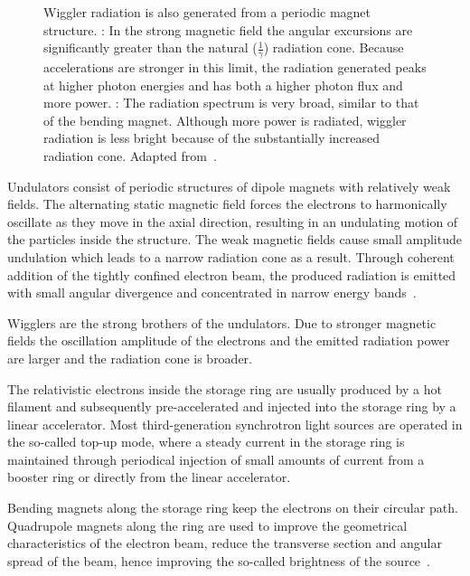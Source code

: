 \begin{figure}%
	\noindent{}
	\caption[Wiggler radiation]{Wiggler radiation is also generated from a periodic magnet structure. %
		: In the strong magnetic field the angular excursions are significantly greater than the natural ($\frac{1}{\gamma}$) radiation cone. Because accelerations are stronger in this limit, the radiation generated peaks at higher photon energies and has both a higher photon flux and more power. %
		: The radiation spectrum is very broad, similar to that of the bending magnet. Although more power is radiated, wiggler radiation is less bright because of the substantially increased radiation cone. Adapted from~\cite{Attwood2007}.}%
	\label{fig:wiggler}
\end{figure}%

Undulators consist of periodic structures of dipole magnets with relatively weak fields. The alternating static magnetic field forces the electrons to harmonically oscillate as they move in the axial direction, resulting in an undulating motion of the particles inside the structure. The weak magnetic fields cause small amplitude undulation which leads to a narrow radiation cone as a result. Through coherent addition of the tightly confined electron beam, the produced radiation is emitted with small angular divergence and concentrated in narrow energy bands~\cite{Stampanoni2002a}.

Wigglers are the strong brothers of the undulators. Due to stronger magnetic fields the oscillation amplitude of the electrons and the emitted radiation power are larger and the radiation cone is broader.

The relativistic electrons inside the storage ring are usually produced by a hot filament and subsequently pre-accelerated and injected into the storage ring by a linear accelerator. Most third-generation synchrotron light sources are operated in the so-called top-up mode, where a steady current in the storage ring is maintained through periodical injection of small amounts of current from a booster ring or directly from the linear accelerator. 

Bending magnets along the storage ring keep the electrons on their circular path. Quadrupole magnets along the ring are used to improve the geometrical characteristics of the electron beam, \ie reduce the transverse section and angular spread of the beam, hence improving the so-called brightness of the source~\cite{Margaritondo2002}.

